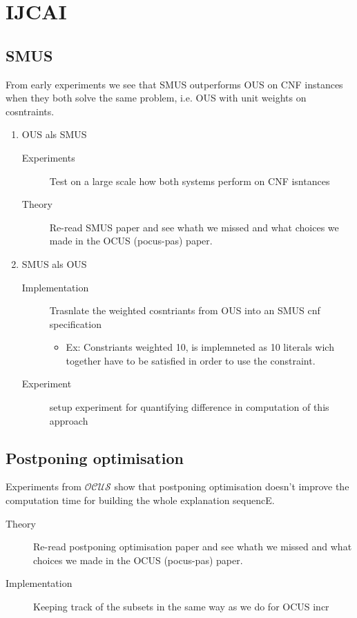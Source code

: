 \documentclass{article}
\newcommand\m[1]{\mathcal{#1}}
\newcommand\comment[1]{\marginpar{\tiny #1}}
\renewcommand\comment[1]{#1}
\newcommand{\todo}[1]{{\comment{\color{blue}#1}}}
\begin{document}
\section{IJCAI}
\subsection{SMUS}
From early experiments we see that SMUS outperforms OUS on CNF instances when they both solve the same problem, i.e. OUS with unit weights on cosntraints.

\begin{enumerate}
  \item OUS als SMUS
  \begin{description}
    \item[Experiments] \todo{Test on a large scale how both systems perform on CNF isntances}
    \item[Theory] \todo{Re-read SMUS paper and see whath we missed and what choices we made in the OCUS (pocus-pas) paper.} 
  \end{description}
  \item SMUS als OUS
  \begin{description}
    \item[Implementation] \todo{Trasnlate the weighted cosntriants from OUS into an SMUS cnf specification}
    \begin{itemize}
      \item Ex: Constriants weighted 10, is implemneted as 10 literals wich together have to be satisfied in order to use the constraint.
    \end{itemize}
    \item[Experiment] \todo{setup experiment for quantifying difference in computation of this approach}
  \end{description}
\end{enumerate}

\subsection{Postponing optimisation}
Experiments from $\m{OCUS}$ show that postponing optimisation doesn't improve the computation time for building the whole explanation sequencE.
\begin{description}
  \item[Theory] \todo{Re-read postponing optimisation paper and see whath we missed and what choices we made in the OCUS (pocus-pas) paper.}
  \item[Implementation] \todo{Keeping track of the subsets in the same way as we do for OCUS incr}
\end{description}
\end{document}
